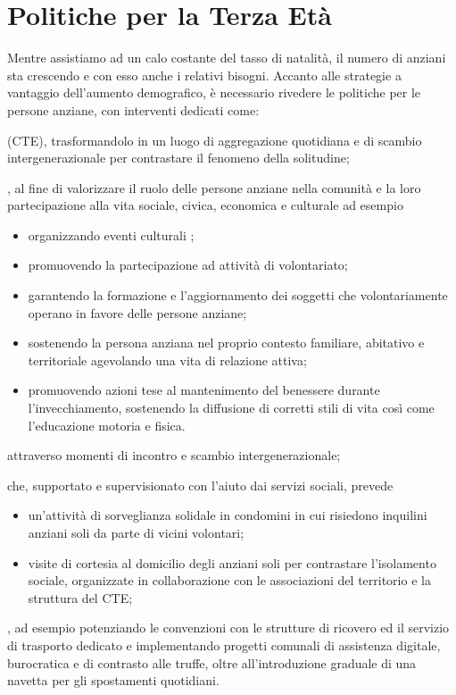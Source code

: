 \section{Politiche per la Terza Età}
Mentre assistiamo ad un calo costante del tasso di natalità, il numero di anziani sta crescendo e con esso anche i relativi bisogni. Accanto alle strategie a vantaggio dell'aumento demografico, è necessario rivedere le politiche per le persone anziane, con interventi dedicati come:

 (CTE), trasformandolo in un luogo di aggregazione quotidiana e di scambio intergenerazionale per contrastare il fenomeno della solitudine;

\begin{bluebox}
, al fine di valorizzare il ruolo delle persone anziane nella comunità e la loro partecipazione alla vita sociale, civica, economica e culturale ad esempio
\begin{itemize}
  \item organizzando eventi culturali %
  ;
  \item promuovendo la partecipazione ad attività di volontariato;
  \item garantendo la formazione e l'aggiornamento dei soggetti che volontariamente operano in favore delle persone anziane; 
  \item sostenendo la persona anziana nel proprio contesto familiare, abitativo e territoriale agevolando una vita di relazione attiva;
  \item promuovendo  azioni tese al mantenimento del benessere durante l'invecchiamento, sostenendo la diffusione di corretti stili di vita così come l'educazione motoria e fisica.
\end{itemize}
\end{bluebox}

attraverso momenti di incontro e scambio intergenerazionale;

 che, supportato e supervisionato con l'aiuto dai servizi sociali, prevede 
\begin{itemize}
  \item un'attività di sorveglianza solidale in condomini in cui risiedono inquilini anziani soli da parte di vicini volontari;  
  \item visite di cortesia al domicilio degli anziani soli per contrastare l'isolamento sociale, organizzate in collaborazione con le associazioni del territorio e la struttura del CTE;
\end{itemize}

, ad esempio potenziando le convenzioni con le strutture di ricovero ed il servizio di trasporto dedicato e implementando progetti comunali di assistenza digitale, burocratica e di contrasto alle truffe, oltre all'introduzione graduale di una navetta per gli spostamenti quotidiani.
